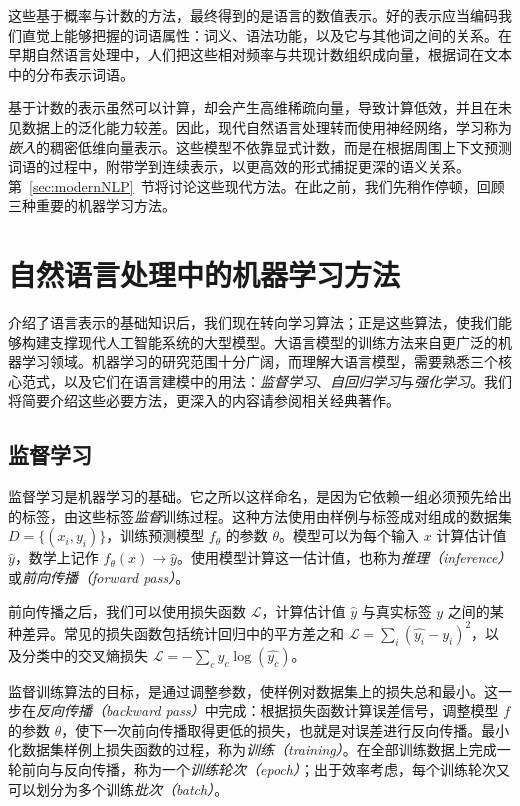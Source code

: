 这些基于概率与计数的方法，最终得到的是语言的数值表示。好的表示应当编码我们直觉上能够把握的词语属性：词义、语法功能，以及它与其他词之间的关系。在早期自然语言处理中，人们把这些相对频率与共现计数组织成向量，根据词在文本中的分布表示词语。

基于计数的表示虽然可以计算，却会产生高维稀疏向量，导致计算低效，并且在未见数据上的泛化能力较差。因此，现代自然语言处理转而使用神经网络，学习称为\textit{嵌入}的稠密低维向量表示。这些模型不依靠显式计数，而是在根据周围上下文预测词语的过程中，附带学到连续表示，以更高效的形式捕捉更深的语义关系。第~\ref{sec:modernNLP}~节将讨论这些现代方法。在此之前，我们先稍作停顿，回顾三种重要的机器学习方法。

\section{自然语言处理中的机器学习方法}
\label{sec:machinelearning}
介绍了语言表示的基础知识后，我们现在转向学习算法；正是这些算法，使我们能够构建支撑现代人工智能系统的大型模型。大语言模型的训练方法来自更广泛的机器学习领域。机器学习的研究范围十分广阔，而理解大语言模型，需要熟悉三个核心范式，以及它们在语言建模中的用法：\emph{监督学习}、\emph{自回归学习}与\emph{强化学习}。我们将简要介绍这些必要方法，更深入的内容请参阅相关经典著作。

\subsection{监督学习}
监督学习是机器学习的基础。它之所以这样命名，是因为它依赖一组必须预先给出的标签，由这些标签\textit{监督}训练过程。这种方法使用由样例与标签成对组成的数据集 $D = \{(x_i, y_i)\}$，训练预测模型 $f_\theta$ 的参数 $\theta$。模型可以为每个输入 $x$ 计算估计值 $\hat{y}$，数学上记作 $f_\theta(x) \rightarrow \hat{y}$。使用模型计算这一估计值，也称为{\em 推理（inference）}或{\em 前向传播（forward pass）}。

前向传播之后，我们可以使用损失函数 $\mathcal{L}$，计算估计值 $\hat{y}$ 与真实标签 $y$ 之间的某种差异。常见的损失函数包括统计回归中的平方差之和 $\mathcal{L} = \sum_i(\hat{y_i} - y_i)^2$，以及分类中的交叉熵损失 $\mathcal{L} = -\sum_cy_c\log(\hat{y_c})$。

监督训练算法的目标，是通过调整参数，使样例对数据集上的损失总和最小。这一步在{\em 反向传播（backward pass）}中完成：根据损失函数计算误差信号，调整模型 $f$ 的参数 $\theta$，使下一次前向传播取得更低的损失，也就是对误差进行反向传播。最小化数据集样例上损失函数的过程，称为\emph{训练（training）}。在全部训练数据上完成一轮前向与反向传播，称为一个\textit{训练轮次（epoch）}；出于效率考虑，每个训练轮次又可以划分为多个训练\textit{批次（batch）}。

